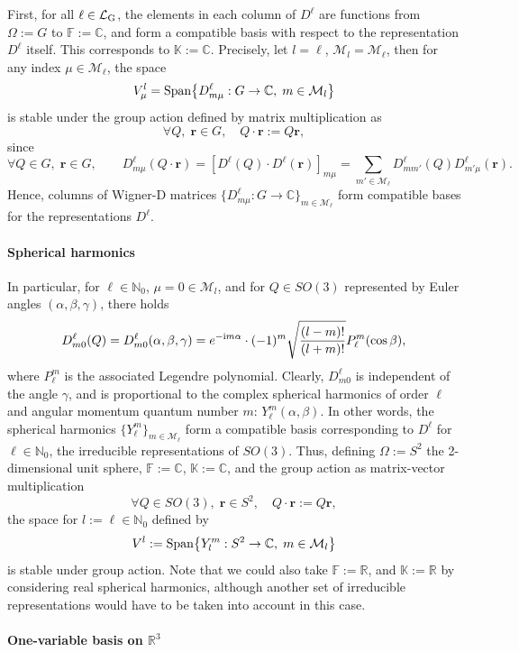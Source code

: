 \documentclass{article}
\numberwithin{equation}{section}
\def\N{\mathbb{N}}
\def\K{\mathbb{K}}
\def\R{\mathbb{R}}
\def\C{\mathbb{C}}
\def\F{\mathbb{F}}
\def\br{{\bm r}}
\def\calM{\mathcal{M}}
\def\calL{\mathcal{L}}
\def\calLG{\mathcal{\calL_{\rm G}}}
\begin{document}
{First, for all $\ell\in\calLG$, the elements in each column of $D^\ell$ are functions from $\Omega := G$ to $\F := \C$, and form a compatible basis with respect to the representation $D^\ell$ itself. This corresponds to $\K := \C$.
Precisely, let $l=\ell$, $\calM_l=\calM_\ell$, then for any index $\mu\in\calM_\ell$, the space
\[
    \displaystyle V^l_\mu = \textup{Span} 
    \big\{D^\ell_{m\mu}:G\to\C, \; m\in\calM_l \big\}
\]
is stable under the group action defined by matrix multiplication as
\[
    \forall Q, \; \br \in G, \quad 
    Q \cdot \br := Q \br,
\]
since
\[
    \forall Q \in G, \; \br \in G,  \qquad D^\ell_{m \mu }(Q\cdot \br) = [D^\ell(Q)\cdot D^\ell(\br)]_{m \mu}=\sum_{m'\in\calM_\ell}D^\ell_{mm'}(Q)D^\ell_{m' \mu}(\br).
\]
Hence, columns of Wigner-D matrices $\{D^\ell_{m\mu}:G\to\C\}_{m\in\calM_\ell}$ form compatible bases for the representations $D^\ell$. 

\paragraph{Spherical harmonics}

In particular, for $\ell\in\N_0$, $\mu=0\in\calM_l$, and for $Q\in SO(3)$ represented by Euler angles $(\alpha,\beta,\gamma)$, there holds
\[
    D^\ell_{m0}(Q) = D^\ell_{m0}(\alpha,\beta,\gamma) = e^{-\textup{i}m\alpha}\cdot (-1)^m\sqrt{\frac{(l-m)!}{(l+m)!}}P_\ell^m(\cos\beta),
\]
where $P_\ell^m$ is the associated Legendre polynomial. Clearly, $D^\ell_{m0}$ is independent of the angle $\gamma$, and is proportional to the complex spherical harmonics of order $\ell$ and angular momentum quantum number $m$: $Y_\ell^m(\alpha,\beta)$.
In other words, the spherical harmonics $\{Y_\ell^m\}_{m\in \calM_\ell}$ form a compatible basis corresponding to $D^\ell$ for $\ell\in\N_0$, the irreducible representations of $SO(3)$. Thus, defining $\Omega := S^2$ the 2-dimensional unit sphere, $\F := \C$, $\K:= \C$, and the group action as matrix-vector multiplication
\[
    \forall Q \in SO(3), \; \br \in S^2, \quad 
    Q\cdot \br := Q\br,
\]
the space for $l:=\ell\in \N_0$ defined by
\[
    V^l := \textup{Span} \big\{Y_l^m:S^2\to\C, \; 
    m\in\calM_l \big\}
\]
is stable under group action. Note that we could also take $\F := \R$, and $\K :=\R$ by considering real spherical harmonics, although another set of irreducible representations would have to be taken into account in this case.

\paragraph{One-variable basis on $\R^3$}

}
\end{document}
